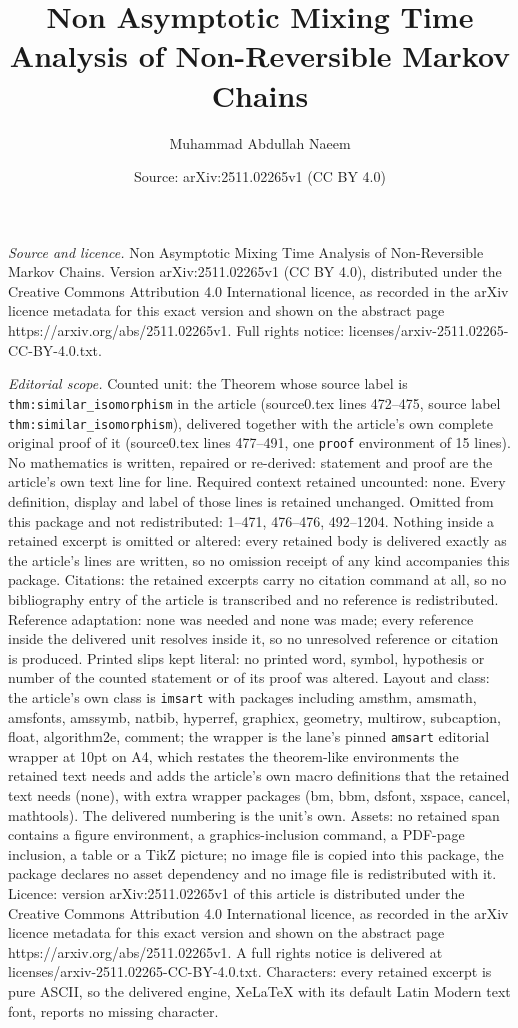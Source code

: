 \documentclass[10pt,a4paper]{amsart}
\title[Non Asymptotic Mixing Time Analysis of Non-Reversible Markov]{Non Asymptotic Mixing Time Analysis of Non-Reversible Markov Chains}
\author{Muhammad Abdullah Naeem}
\date{Source: arXiv:2511.02265v1 (CC BY 4.0)}
\begin{document}
\maketitle

\noindent\emph{Source and licence.} Non Asymptotic Mixing Time Analysis of Non-Reversible Markov Chains. Version arXiv:2511.02265v1 (CC BY 4.0), distributed under the Creative Commons Attribution 4.0 International licence, as recorded in the arXiv licence metadata for this exact version and shown on the abstract page https://arxiv.org/abs/2511.02265v1. Full rights notice: licenses/arxiv-2511.02265-CC-BY-4.0.txt.\par\smallskip

\noindent\textit{Editorial scope.} Counted unit: the Theorem whose source label is \texttt{thm:similar\_isomorphism} in the article (source0.tex lines 472--475, source label \texttt{thm:similar\_isomorphism}), delivered together with the article's own complete original proof of it (source0.tex lines 477--491, one \texttt{proof} environment of 15 lines). No mathematics is written, repaired or re-derived: statement and proof are the article's own text line for line. Required context retained uncounted: none. Every definition, display and label of those lines is retained unchanged. Omitted from this package and not redistributed: 1--471, 476--476, 492--1204. Nothing inside a retained excerpt is omitted or altered: every retained body is delivered exactly as the article's lines are written, so no omission receipt of any kind accompanies this package. Citations: the retained excerpts carry no citation command at all, so no bibliography entry of the article is transcribed and no reference is redistributed. Reference adaptation: none was needed and none was made; every reference inside the delivered unit resolves inside it, so no unresolved reference or citation is produced. Printed slips kept literal: no printed word, symbol, hypothesis or number of the counted statement or of its proof was altered. Layout and class: the article's own class is \texttt{imsart} with packages including amsthm, amsmath, amsfonts, amssymb, natbib, hyperref, graphicx, geometry, multirow, subcaption, float, algorithm2e, comment; the wrapper is the lane's pinned \texttt{amsart} editorial wrapper at 10pt on A4, which restates the theorem-like environments the retained text needs and adds the article's own macro definitions that the retained text needs (none), with extra wrapper packages (bm, bbm, dsfont, xspace, cancel, mathtools). The delivered numbering is the unit's own. Assets: no retained span contains a figure environment, a graphics-inclusion command, a PDF-page inclusion, a table or a TikZ picture; no image file is copied into this package, the package declares no asset dependency and no image file is redistributed with it. Licence: version arXiv:2511.02265v1 of this article is distributed under the Creative Commons Attribution 4.0 International licence, as recorded in the arXiv licence metadata for this exact version and shown on the abstract page https://arxiv.org/abs/2511.02265v1. A full rights notice is delivered at licenses/arxiv-2511.02265-CC-BY-4.0.txt. Characters: every retained excerpt is pure ASCII, so the delivered engine, XeLaTeX with its default Latin Modern text font, reports no missing character.
\end{document}
